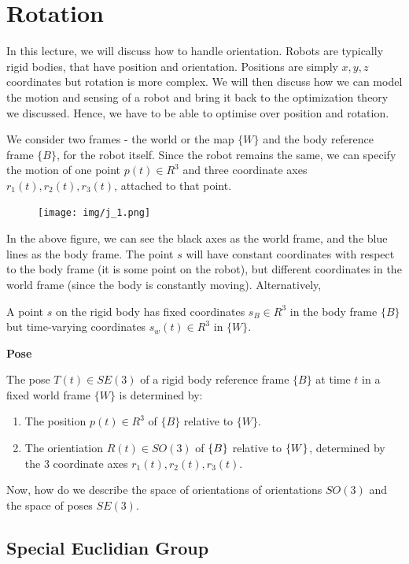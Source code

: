 \chapter{Rotation}
\graphicspath{{../../img/}}


In this lecture, we will discuss how to handle orientation. Robots are typically rigid bodies, that have position and orientation. Positions are simply $x,y, z$ coordinates but rotation is more complex. We will then discuss how we can model the motion and sensing of a robot and bring it back to the optimization theory we discussed. Hence, we have to be able to optimise over position and rotation.

We consider two frames - the world or the map $\{W\}$ and the body reference frame $\{B\}$, for the robot itself. Since the robot remains the same, we can specify the motion of one point $p(t) \in R^3$ and three coordinate axes $r_1(t), r_2(t), r_3(t)$, attached to that point.

\begin{figure}[h]\centering\texttt{[image: img/j\_1.png]}\end{figure}

In the above figure, we can see the black axes as the world frame, and the blue lines as the body frame. The point $s$ will have constant coordinates with respect to the body frame (it is some point on the robot), but different coordinates in the world frame (since the body is constantly moving). Alternatively,

A point $s$ on the rigid body has fixed coordinates $s_B\in R^3$ in the body frame $\{B\}$ but time-varying coordinates $s_w(t)\in R^3$ in $\{W\}$.

\textbf{Pose}

The pose $T(t)\in SE(3)$ of a rigid body reference frame $\{B\}$ at time $t$ in a fixed world frame $\{W\}$ is determined by:

\begin{enumerate}
    \item The position $p(t)\in R^3$ of $\{B\}$ relative to $\{W\}$.
    \item The orientiation $R(t) \in SO(3)$ of $\{B\}$ relative to $\{W\}$, determined by the 3 coordinate axes $r_1(t), r_2(t), r_3(t)$.
\end{enumerate}

Now, how do we describe the space of orientations of orientations $SO(3)$ and the space of poses $SE(3)$.

\section{Special Euclidian Group}

